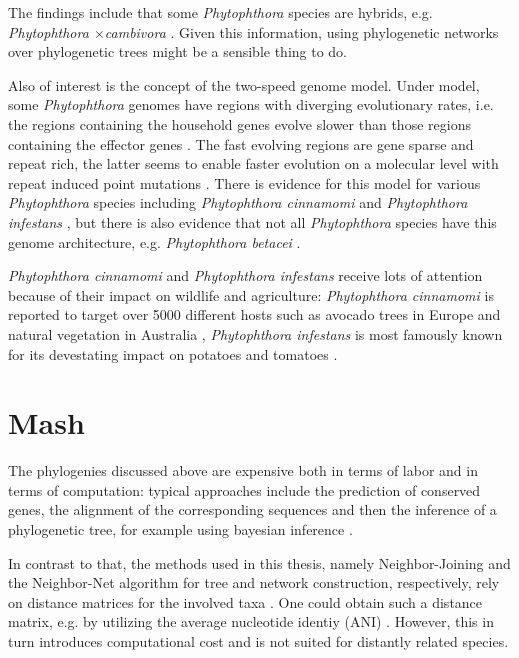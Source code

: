 The findings include that some \textit{Phytophthora} species are
hybrids, e.g. \textit{Phytophthora $\times$cambivora}
\cite{jungSixNewPhytophthora2017,vanpouckeUnravellingHybridizationPhytophthora2021}.
Given this information, using phylogenetic networks over phylogenetic trees
might be a sensible thing to do.

Also of interest is the concept of the two-speed genome model. Under model, some
\textit{Phytophthora} genomes have regions with diverging evolutionary rates,
i.e. the regions containing the household genes evolve slower than those regions
containing the effector genes \cite{dongTwospeedGenomesFilamentous2015}. The
fast evolving regions are gene sparse and repeat rich, the latter seems to
enable faster evolution on a molecular level with repeat induced point mutations
\cite{dongTwospeedGenomesFilamentous2015}. There is evidence for this model for
various \textit{Phytophthora} species including \textit{Phytophthora cinnamomi}
\cite{engelbrechtGenomeDestructiveOomycete2021} and \textit{Phytophthora
infestans}
\cite{ayala-usmaWholeGenomeDuplication2021,dongTwospeedGenomesFilamentous2015},
but there is also evidence that not all \textit{Phytophthora} species have this
genome architecture, e.g. \textit{Phytophthora betacei}
\cite{ayala-usmaWholeGenomeDuplication2021}.

\textit{Phytophthora cinnamomi} and \textit{Phytophthora infestans} receive lots
of attention because of their impact on wildlife and agriculture:
\textit{Phytophthora cinnamomi} is reported to target over 5000 different hosts
such as avocado trees in Europe and natural vegetation in Australia
\cite{hardhamPhytophthoraCinnamomi2018,solis-garciaPhytophthoraRootRot2020},
\textit{Phytophthora infestans} is most famously known for its devestating
impact on potatoes and tomatoes \cite{ayala-usmaWholeGenomeDuplication2021}.


\section{Mash}
The phylogenies discussed above are expensive both in terms of labor and in
terms of computation: typical approaches include the prediction of conserved
genes, the alignment of the corresponding sequences and then the inference of a
phylogenetic tree, for example using bayesian inference
\cite{abadPhytophthoraTaxonomicPhylogenetic2023a,winkworthComparativeAnalysesComplete2022}.

In contrast to that, the methods used in this thesis, namely Neighbor-Joining
and the Neighbor-Net algorithm for tree and network construction, respectively,
rely on distance matrices for the involved taxa
\cite{saitouNeighborjoiningMethodNew1987,bryantNeighborNetImprovedAlgorithms2023,bryantNeighborNetAgglomerativeMethod2004}.
One could obtain such a distance matrix, e.g. by utilizing the average
nucleotide identiy (ANI) \cite{leeOrthoANIImprovedAlgorithm2016}. However, this
in turn introduces computational cost and is not suited for distantly related
species.

